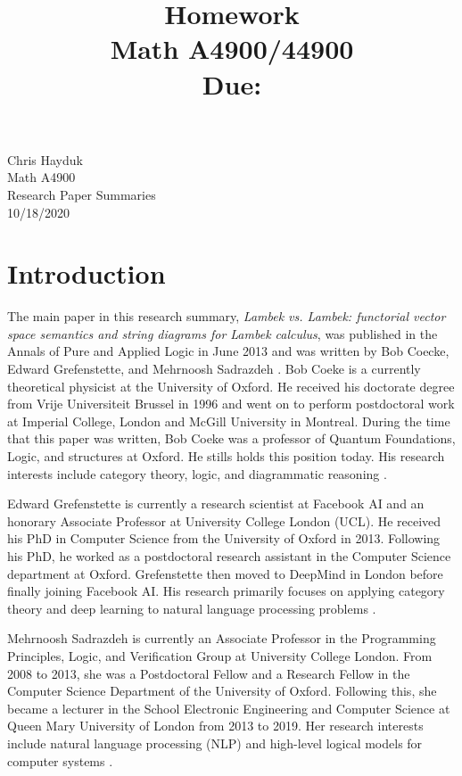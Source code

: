 \documentclass[11pt, reqno]{amsart}
\title[Homework \HW]{Homework \HW \\
Math A4900/44900\\
\small Due: \DUE}
\author{}
\theoremstyle{plain}
\theoremstyle{definition}
\theoremstyle{example}
\def\DUE{10/18/2020}
\begin{document}
\begin{flushright}
Chris Hayduk\\
Math A4900\\
Research Paper Summaries\\
\DUE
\end{flushright}

\section{Introduction}
\indent
The main paper in this research summary, \textit{Lambek vs. Lambek: functorial vector space semantics and string diagrams for Lambek calculus}, was published in the Annals of Pure and Applied Logic in June 2013 and was written by Bob Coecke, Edward Grefenstette, and Mehrnoosh Sadrazdeh \cite{lambekvlambek}. Bob Coeke is a currently theoretical physicist at the University of Oxford. He received his doctorate degree from Vrije Universiteit Brussel in 1996 and went on to perform postdoctoral work at Imperial College, London and McGill University in Montreal. During the time that this paper was written, Bob Coeke was a professor of Quantum Foundations, Logic, and structures at Oxford. He stills holds this position today. His research interests include category theory, logic, and diagrammatic reasoning \cite{coecke}.
\par
Edward Grefenstette is currently a research scientist at Facebook AI and an honorary Associate Professor at University College London (UCL). He received his PhD in Computer Science from the University of Oxford in 2013. Following his PhD, he worked as a postdoctoral research assistant in the Computer Science department at Oxford. Grefenstette then moved to DeepMind in London before finally joining Facebook AI. His research primarily focuses on applying category theory and deep learning to natural language processing problems \cite{grefenstette}.
\par
Mehrnoosh Sadrazdeh is currently an Associate Professor in the Programming Principles, Logic, and Verification Group at University College London. From 2008 to 2013, she was a Postdoctoral Fellow and a Research Fellow in the Computer Science Department of the University of Oxford. Following this, she became a lecturer in the School Electronic Engineering and Computer Science at Queen Mary University of London from 2013 to 2019. Her research interests include natural language processing (NLP) and high-level logical models for computer systems \cite{sadrzadeh}.
\end{document}

